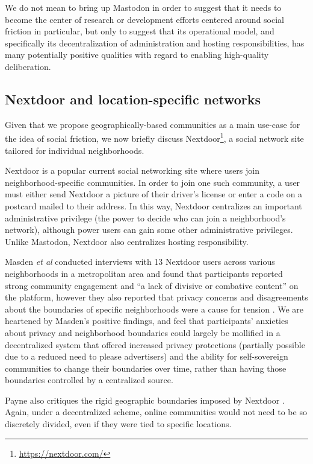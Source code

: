 \documentclass[sigconf,authordraft]{acmart}
\begin{document}
We do not mean to bring up Mastodon in order to suggest that it needs to become the center of research or development efforts centered around social friction in particular, but only to suggest that its operational model, and specifically its decentralization of administration and hosting responsibilities, has many potentially positive qualities with regard to enabling high-quality deliberation.

\subsection{Nextdoor and location-specific networks}

Given that we propose geographically-based communities as a main use-case for the idea of social friction, we now briefly discuss Nextdoor\footnote{\url{https://nextdoor.com/}}, a social network site tailored for individual neighborhoods.

Nextdoor is a popular current social networking site where users join neighborhood-specific communities. In order to join one such community, a user must either send Nextdoor a picture of their driver's license or enter a code on a postcard mailed to their address. In this way, Nextdoor centralizes an important administrative privilege (the power to decide who can join a neighborhood's network), although power users can gain some other administrative privileges. Unlike Mastodon, Nextdoor also centralizes hosting responsibility.

Masden {\itshape et al} conducted interviews with 13 Nextdoor users across various neighborhoods in a metropolitan area and found that participants reported strong community engagement and ``a lack of divisive or combative content'' on the platform, however they also reported that privacy concerns and disagreements about the boundaries of specific neighborhoods were a cause for tension \cite{masden2014tensions}. We are heartened by Masden's positive findings, and feel that participants' anxieties about privacy and neighborhood boundaries could largely be mollified in a decentralized system that offered increased privacy protections (partially possible due to a reduced need to please advertisers) and the ability for self-sovereign communities to change their boundaries over time, rather than having those boundaries controlled by a centralized source.

Payne also critiques the rigid geographic boundaries imposed by Nextdoor \cite{payne2017welcome}. Again, under a decentralized scheme, online communities would not need to be so discretely divided, even if they were tied to specific locations.
\end{document}
